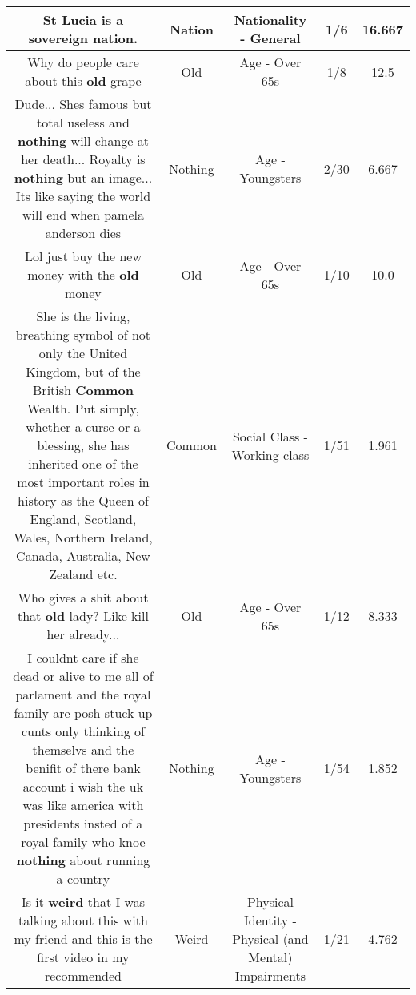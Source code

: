 \documentclass[11pt]{article}
\newlength\mylength
\begin{document}
\begin{center}
\begin{longtable}{|C{.65\mylength}|C{.30\mylength}|C{.12\mylength}|C{.12\mylength}|C{.12\mylength}|}
  \small St Lucia is a sovereign \textbf{nation}.\normalsize   & Nation & Nationality - General & 1/6 & 16.667 \\  \hline
  \small Why do people care about this \textbf{old} grape\normalsize   & Old & Age - Over 65s & 1/8 & 12.5 \\  \hline
  \small Dude... Shes famous but total useless and \textbf{nothing} will change at her death... Royalty is \textbf{nothing} but an image... Its like saying the world will end when pamela anderson dies\normalsize   & Nothing & Age - Youngsters & 2/30 & 6.667 \\  \hline
  \small Lol just buy the new money with the \textbf{old} money\normalsize   & Old & Age - Over 65s & 1/10 & 10.0 \\  \hline
  \small She is the living, breathing symbol of not only the United Kingdom, but of the British \textbf{Common} Wealth. Put simply, whether a curse or a blessing, she has inherited one of the most important roles in history as the Queen of England, Scotland, Wales, Northern Ireland, Canada, Australia, New Zealand etc.\normalsize   & Common & Social Class - Working class & 1/51 & 1.961 \\  \hline
  \small Who gives a shit about that \textbf{old} lady? Like kill her already...\normalsize   & Old & Age - Over 65s & 1/12 & 8.333 \\  \hline
  \small I couldnt care if she dead or alive to me all of parlament and the royal family are posh stuck up cunts only thinking of themselvs and the benifit of there bank account i wish the uk was like america with presidents insted of a royal family who knoe \textbf{nothing} about running a country\normalsize   & Nothing & Age - Youngsters & 1/54 & 1.852 \\  \hline
  \small Is it \textbf{weird} that I was talking about this with my friend and this is the first video in my recommended\normalsize   & Weird & Physical Identity - Physical (and Mental) Impairments & 1/21 & 4.762 \\  \hline

\end{longtable}
\end{center}
\end{document}
